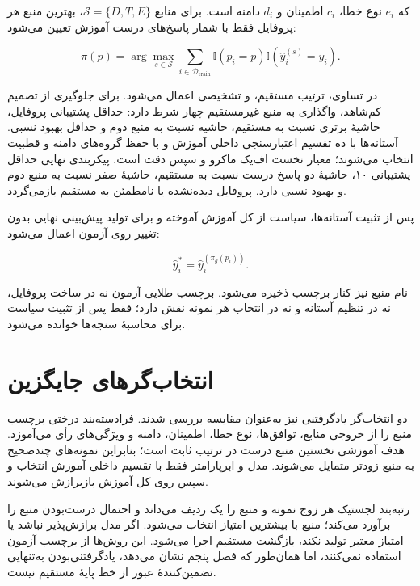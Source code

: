که $e_i$ نوع خطا، $c_i$ اطمینان و $d_i$ دامنه است. برای منابع $\mathcal S=\{D,T,E\}$، بهترین منبع هر پروفایل فقط با شمار پاسخ‌های درست آموزش تعیین می‌شود:

\begin{equation}
    \pi(p)=\arg\max_{s\in\mathcal S}
    \sum_{i\in\mathcal D_{\mathrm{train}}}
    \mathbb{I}(p_i=p)\mathbb{I}(\hat y_i^{(s)}=y_i).
    \label{eq:train-tuned-policy}
\end{equation}

در تساوی، ترتیب مستقیم،  و تشخیصی اعمال می‌شود. برای جلوگیری از تصمیم کم‌شاهد، واگذاری به منبع غیرمستقیم چهار شرط دارد: حداقل پشتیبانی پروفایل، حاشیۀ برتری نسبت به مستقیم، حاشیه نسبت به منبع دوم و حداقل بهبود نسبی. آستانه‌ها با ده تقسیم اعتبارسنجی داخلی آموزش و با حفظ گروه‌های دامنه و قطبیت انتخاب می‌شوند؛ معیار نخست اف‌یک ماکرو و سپس دقت است. پیکربندی نهایی حداقل پشتیبانی ۱۰، حاشیۀ دو پاسخ درست نسبت به مستقیم، حاشیۀ صفر نسبت به منبع دوم و بهبود نسبی  دارد. پروفایل دیده‌نشده یا نامطمئن به مستقیم بازمی‌گردد.

پس از تثبیت آستانه‌ها، سیاست از کل آموزش آموخته و برای تولید پیش‌بینی نهایی بدون تغییر روی آزمون اعمال می‌شود:

\begin{equation}
    \hat y_i^{*}=\hat y_i^{(\pi_g(p_i))}.
    \label{eq:selected-final-prediction}
\end{equation}

نام منبع نیز کنار برچسب ذخیره می‌شود. برچسب طلایی آزمون نه در ساخت پروفایل، نه در تنظیم آستانه و نه در انتخاب هر نمونه نقش دارد؛ فقط پس از تثبیت سیاست برای محاسبۀ سنجه‌ها خوانده می‌شود.

\section{انتخاب‌گرهای جایگزین}

دو انتخاب‌گر یادگرفتنی نیز به‌عنوان مقایسه بررسی شدند. فرادسته‌بند درختی برچسب منبع را از خروجی منابع، توافق‌ها، نوع خطا، اطمینان، دامنه و ویژگی‌های رأی می‌آموزد. هدف آموزشی نخستین منبع درست در ترتیب ثابت است؛ بنابراین نمونه‌های چندصحیح به منبع زودتر متمایل می‌شوند. مدل و ابرپارامتر فقط با تقسیم داخلی آموزش انتخاب و سپس روی کل آموزش بازبرازش می‌شوند.

رتبه‌بند لجستیک هر زوج نمونه و منبع را یک ردیف می‌داند و احتمال درست‌بودن منبع را برآورد می‌کند؛ منبع با بیشترین امتیاز انتخاب می‌شود. اگر مدل برازش‌پذیر نباشد یا امتیاز معتبر تولید نکند، بازگشت مستقیم اجرا می‌شود. این روش‌ها از برچسب آزمون استفاده نمی‌کنند، اما همان‌طور که فصل پنجم نشان می‌دهد، یادگرفتنی‌بودن به‌تنهایی تضمین‌کنندۀ عبور از خط پایۀ مستقیم نیست.

